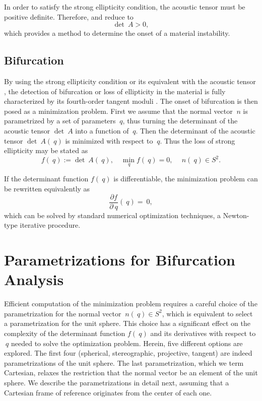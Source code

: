 \documentclass[12pt]{article}
\numberwithin{equation}{section}
\begin{document}
In order to satisfy the strong ellipticity condition, the acoustic
tensor must be positive definite. Therefore,
 and  reduce
to
\begin{equation} \label{eq:acoustic-determinant}
  \det ~A > 0,
\end{equation}
which provides a method to determine the onset of a material
instability.

\subsection{Bifurcation}

By using the strong ellipticity condition
 or its equivalent with the acoustic
tensor , the detection of bifurcation
or loss of ellipticity in the material is fully characterized by its
fourth-order tangent moduli . The
onset of bifurcation is then posed as a minimization problem.  First
we assume that the normal vector $~n$ is parametrized by a set of
parameters $~q$, thus turning the determinant of the acoustic tensor
$\det ~A$ into a function of $~q$.  Then the determinant of the
acoustic tensor $\det ~A(~q)$ is minimized with respect to
$~q$. Thus the loss of strong ellipticity may be stated as
\begin{equation} \label{eq:minimization-determinant}
  f(~q) := \det ~A(~q),
  \quad
  \min_{~q} f(~q) = 0,
  \quad
  ~n(~q) \in S^2.
\end{equation}

If the determinant function $f(~q)$ is differentiable, the
minimization problem can be rewritten equivalently as
\begin{equation}\label{eq:minimization-derivative}
  \frac{\partial f}{\partial ~q}(~q) = ~0,
\end{equation}
which can be solved by standard numerical optimization techniques, \eg
a Newton-type iterative procedure.

\section{Parametrizations for Bifurcation Analysis}
\label{sec:parametrizations}

Efficient computation of the minimization problem
 requires a careful choice of the
parametrization for the normal vector $~n(~q) \in S^2$, which is
equivalent to select a parametrization for the unit sphere. This
choice has a significant effect on the complexity of the determinant
function $f(~q)$ and its derivatives with respect to $~q$ needed to
solve the optimization problem. Herein, five different options are
explored. The first four (spherical, stereographic, projective,
tangent) are indeed parametrizations of the unit sphere.  The last
parametrization, which we term Cartesian, relaxes the restriction that
the normal vector be an element of the unit sphere. We describe the
parametrizations in detail next, assuming that a Cartesian frame of
reference originates from the center of each one.
\end{document}
